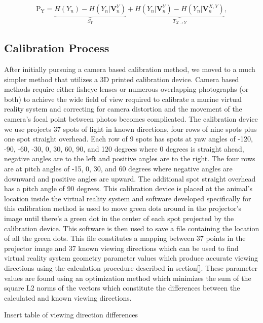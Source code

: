 \documentclass[10pt,letterpaper]{article}
\begin{document}
\begin{eqnarray}
\label{eq:schemeP}
	\mathrm{P_Y} = \underbrace{H(Y_n) - H(Y_n|\mathbf{V}^{Y}_{n})}_{S_Y} +
                       \underbrace{H(Y_n|\mathbf{V}^{Y}_{n})-
                       H(Y_n|\mathbf{V}^{X,Y}_{n})}_{T_{X\rightarrow Y}},
\end{eqnarray}


\subsection*{Calibration Process}

After initially pursuing a camera based calibration method, we moved to a much
simpler method that utilizes a 3D printed calibration device. Camera based
methods require either fisheye lenses or numerous overlapping photographs (or
both) to achieve the wide field of view required to calibrate a murine virtual
reality system and correcting for camera distortion and the movement of the
camera's focal point between photos becomes complicated.  The calibration
device we use projects 37 spots of light in known directions, four rows of nine
spots plus one spot straight overhead. Each row of 9 spots has spots at yaw
angles of -120, -90, -60, -30, 0, 30, 60, 90, and 120 degrees where 0 degrees
is straight ahead, negative angles are to the left and positive angles are to
the right.  The four rows are at pitch angles of -15, 0, 30, and 60 degrees
where negative angles are downward and positive angles are upward. The
additional spot straight overhead has a pitch angle of 90 degrees. This
calibration device is placed at the animal's location inside the virtual
reality system and software developed specifically for this calibration method
is used to move green dots around in the projector's image until there's a
green dot in the center of each spot projected by the calibration device. This
software is then used to save a file containing the location of all the green
dots. This file constitutes a mapping between 37 points in the projector image
and 37 known viewing directions which can be used to find virtual reality
system geometry parameter values which produce accurate viewing directions
using the calculation procedure described in section\ref{}.  These parameter
values are found using an optimization method which minimizes the sum of the
square L2 norms of the vectors which constitute the differences between the
calculated and known viewing directions.

Insert table of viewing direction differences
\end{document}
